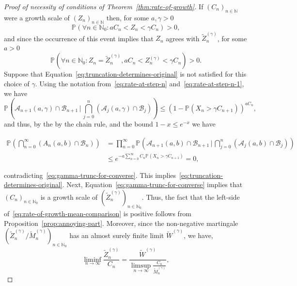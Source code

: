 \documentclass[12pt]{article}
\theoremstyle{definition}
\newcommand{\Prob}[2][]{\ensuremath{\mathbb{P}_{#1} \left(#2 \right)}}
\begin{document}
\begin{proof}[Proof of necessity of conditions of Theorem~\ref{thm:rate-of-growth}] If $(C_{n})_{n \in \mathbb{N}}$ were a growth scale of $(Z_{n})_{n \in \mathbb{N}}$ then, for some $a, \gamma > 0$
\[
\Prob{\forall n \in \mathbb{N}_0\colon a C_{n} < Z_{n} < \gamma C_{n}} > 0,
\]
and since the occurrence of this event implies that $Z_n$ agrees with $\tilde{Z}^{(\gamma)}_{n}$, for some $a > 0$ 
\begin{equation} \label{eq:gamma-trunc-for-converse}
\Prob{\forall n \in \mathbb{N}_0 \colon Z_{n} = \tilde{Z}^{(\gamma)}_{n}, a C_{n} < Z^{(\gamma)}_{n} < \gamma C_{n}} > 0.
\end{equation}
Suppose that Equation~\eqref{eq:truncation-determines-original} is not satisfied for this choice of $\gamma$. Using the notation from~\eqref{eq:rate-at-step-n} and~\eqref{eq:rate-at-step-n-1}, we have 
\[
\Prob{\mathcal{A}_{n+1}(a,\gamma) \cap  \mathcal{B}_{n+1} \, \bigg | \, \bigcap_{j=0}^{n} (\mathcal{A}_{j}(a,\gamma) \cap \mathcal{B}_{j})} \leq (1-\Prob{X_{n} > \gamma C_{n+1}})^{a C_n},
\]
and thus, by the by the chain rule, and the bound $1-x \leq e^{-x}$ we have
\begin{linenomath}
    \begin{align*}
        \Prob{\bigcap_{n=0}^{\infty} \left(A_{n}(a,b) \cap \mathcal{B}_{n} \right)} & = \prod_{n=0}^{\infty} \Prob{\mathcal{A}_{n+1}(a,b) \cap \mathcal{B}_{n+1} \, \bigg | \, \bigcap_{j=0}^{n} \left( \mathcal{A}_{j}(a,b) \cap \mathcal{B}_{j} \right)} \\ & \leq e^{-a \sum_{n=0}^{\infty} C_{n} \Prob{X_{n} > \gamma C_{n+1}}} = 0,
    \end{align*}
\end{linenomath}
contradicting~\eqref{eq:gamma-trunc-for-converse}. This implies~\eqref{eq:truncation-determines-original}. 
Next, Equation~\eqref{eq:gamma-trunc-for-converse} implies that $(C_{n})_{n \in \mathbb{N}_0}$ is a growth scale of $(\tilde{Z}^{(\gamma)}_{n})_{n \in \mathbb{N}_0}$. Thus, the fact that the left-side of~\eqref{eq:rate-of-growth-mean-comparison} is positive follows from Proposition~\ref{prop:annoying-part}. Moreover, since the non-negative martingale $(\tilde{Z}^{(\gamma)}_{n}/\tilde{M}^{(\gamma)}_{n})_{n \in \mathbb{N}_{0}}$ has an almost surely finite limit $\tilde{W}^{(\gamma)}$, we have, 
\begin{equation} \label{eq:liminf-blah}
\liminf_{n \to \infty} \frac{\tilde{Z}^{(\gamma)}_{n}}{C_{n}} = \frac{\tilde{W}^{(\gamma)}}{\limsup_{n \to \infty} \frac{C_{n}}{\tilde{M}^{(\gamma)}_{n}}},

\end{equation}
\end{proof}
\end{document}
